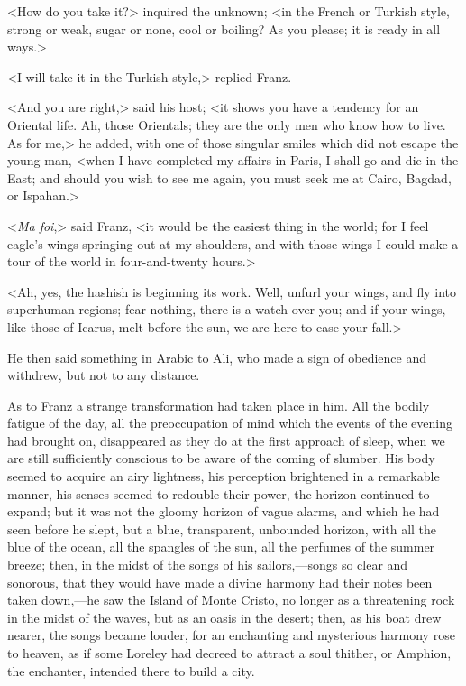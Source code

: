  <How do you take it?> inquired the unknown; <in the French or Turkish style, strong or weak, sugar or none, cool or boiling? As you please; it is ready in all ways.> 

 <I will take it in the Turkish style,> replied Franz. 

 <And you are right,> said his host; <it shows you have a tendency for an Oriental life. Ah, those Orientals; they are the only men who know how to live. As for me,> he added, with one of those singular smiles which did not escape the young man, <when I have completed my affairs in Paris, I shall go and die in the East; and should you wish to see me again, you must seek me at Cairo, Bagdad, or Ispahan.>

<\textit{Ma foi},> said Franz, <it would be the easiest thing in the world; for I feel eagle's wings springing out at my shoulders, and with those wings I could make a tour of the world in four-and-twenty hours.> 

 <Ah, yes, the hashish is beginning its work. Well, unfurl your wings, and fly into superhuman regions; fear nothing, there is a watch over you; and if your wings, like those of Icarus, melt before the sun, we are here to ease your fall.> 

 He then said something in Arabic to Ali, who made a sign of obedience and withdrew, but not to any distance. 

 As to Franz a strange transformation had taken place in him. All the bodily fatigue of the day, all the preoccupation of mind which the events of the evening had brought on, disappeared as they do at the first approach of sleep, when we are still sufficiently conscious to be aware of the coming of slumber. His body seemed to acquire an airy lightness, his perception brightened in a remarkable manner, his senses seemed to redouble their power, the horizon continued to expand; but it was not the gloomy horizon of vague alarms, and which he had seen before he slept, but a blue, transparent, unbounded horizon, with all the blue of the ocean, all the spangles of the sun, all the perfumes of the summer breeze; then, in the midst of the songs of his sailors,—songs so clear and sonorous, that they would have made a divine harmony had their notes been taken down,—he saw the Island of Monte Cristo, no longer as a threatening rock in the midst of the waves, but as an oasis in the desert; then, as his boat drew nearer, the songs became louder, for an enchanting and mysterious harmony rose to heaven, as if some Loreley had decreed to attract a soul thither, or Amphion, the enchanter, intended there to build a city. 

